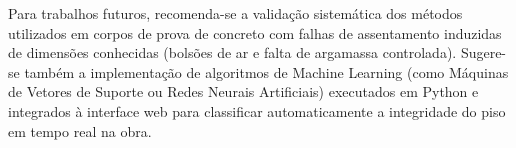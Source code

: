 \documentclass[10pt,twocolumn,fleqn]{article}
\begin{document}
	Para trabalhos futuros, recomenda-se a validação sistemática dos métodos utilizados em corpos de prova de concreto com falhas de assentamento induzidas de dimensões conhecidas (bolsões de ar e falta de argamassa controlada). Sugere-se também a implementação de algoritmos de Machine Learning (como Máquinas de Vetores de Suporte ou Redes Neurais Artificiais) executados em Python e integrados à interface web para classificar automaticamente a integridade do piso em tempo real na obra.
	
	\printbibliography[title={Referências}]
	
\end{document}
